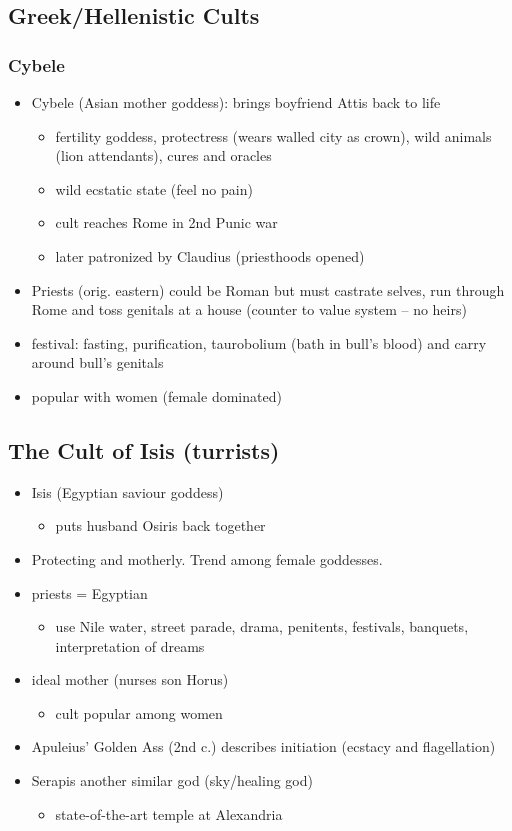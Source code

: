 \documentclass[12pt, twoside]{article}
\begin{document}
\subsection{Greek/Hellenistic Cults}
\subsubsection{Cybele}
\begin{itemize}
\item Cybele (Asian mother goddess): brings boyfriend Attis back to life
	\begin{itemize}
	\item fertility goddess, protectress (wears walled city as crown), wild animals (lion attendants), cures and oracles
	\item wild ecstatic state (feel no pain)
	\item cult reaches Rome in 2nd Punic war
	\item later patronized by Claudius (priesthoods opened)
	\end{itemize}
\item Priests (orig. eastern) could be Roman but must castrate selves, run through Rome and toss genitals at a house (counter to value system – no heirs)
\item festival: fasting, purification, taurobolium (bath in bull's blood) and carry around bull’s genitals
\item popular with women (female dominated)
\end{itemize}

\subsection{The Cult of Isis (turrists)}
\begin{itemize}
\item Isis (Egyptian saviour goddess)
	\begin{itemize}
	\item puts husband Osiris back together
	\end{itemize}
\item Protecting and motherly.  Trend among female goddesses.
\item priests = Egyptian
	\begin{itemize}
	\item use Nile water, street parade, drama, penitents, festivals, banquets, interpretation of dreams
	\end{itemize}
\item ideal mother (nurses son Horus)
	\begin{itemize}
	\item cult popular among women
	\end{itemize}
\item Apuleius’ Golden Ass (2nd c.) describes initiation (ecstacy and flagellation)
\item Serapis another similar god (sky/healing god)
	\begin{itemize}
	\item state-of-the-art temple at Alexandria
	\end{itemize}
\end{itemize}
\end{document}
